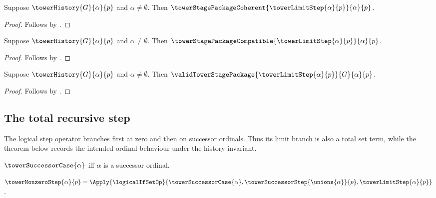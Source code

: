\begin{proposition}\label{tower_limit_step_is_coherent}
    Suppose $\towerHistory{G}{\alpha}{p}$ and
        $\alpha\neq\emptyset$.
    Then $\towerStagePackageCoherent
        {\towerLimitStep{\alpha}{p}}{\alpha}{p}$.
\end{proposition}
\begin{proof}
    Follows by
        .
\end{proof}

\begin{proposition}\label{tower_limit_step_compatible}
    Suppose $\towerHistory{G}{\alpha}{p}$ and
        $\alpha\neq\emptyset$.
    Then $\towerStagePackageCompatible
        {\towerLimitStep{\alpha}{p}}{\alpha}{p}$.
\end{proposition}
\begin{proof}
    Follows by
        .
\end{proof}

\begin{theorem}\label{tower_limit_step_valid}
    Suppose $\towerHistory{G}{\alpha}{p}$ and
        $\alpha\neq\emptyset$.
    Then $\validTowerStagePackage
        {\towerLimitStep{\alpha}{p}}{G}{\alpha}{p}$.
\end{theorem}
\begin{proof}
    Follows by
        .
\end{proof}

\subsection{The total recursive step}

The logical step operator branches first at zero and then on successor
ordinals.  Thus its limit branch is also a total set term, while the theorem
below records the intended ordinal behaviour under the history invariant.

\begin{definition}\label{tower_successor_case}
    $\towerSuccessorCase{\alpha}$ iff
        $\alpha$ is a successor ordinal.
\end{definition}

\begin{definition}\label{tower_nonzero_step}
    $\towerNonzeroStep{\alpha}{p}=
        \Apply{\logicalIfSetOp}
            {\towerSuccessorCase{\alpha},\towerSuccessorStep{\unions{\alpha}}{p},\towerLimitStep{\alpha}{p}}$.
\end{definition}


